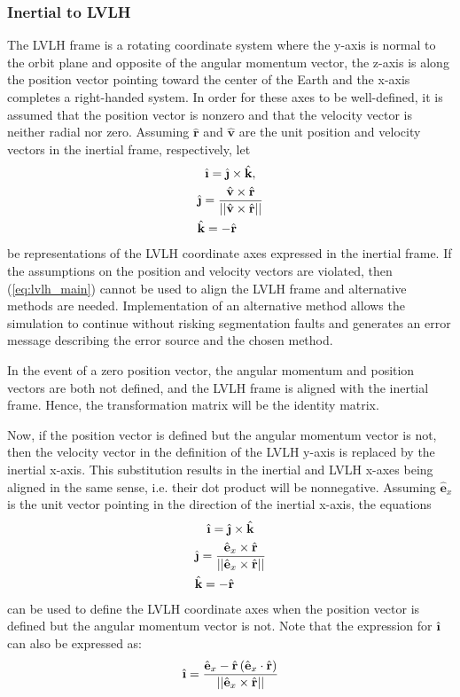 \documentclass[11pt,fleqn]{report}
\begin{document}
\subsubsection{Inertial to LVLH}
The LVLH frame is a rotating coordinate system where the y-axis is normal to
the
orbit plane and opposite of the angular momentum vector, the z-axis
is along the position vector pointing toward the center of the Earth and
the x-axis
completes a right-handed system. In order for these axes to be well-defined,
it
is assumed that the position vector is nonzero and that the velocity vector is
neither radial nor zero. Assuming $\hat{\textbf{r}}$ and $\hat{\textbf{v}}$
are the unit position and velocity vectors in the inertial frame,
respectively, let
\begin{multline}
 \hat{\textbf{\i}} = \hat{\textbf{\j}} \times \hat{\textbf{k}}, \\
 \hat{\textbf{\j}} = \frac{\hat{\textbf{v}} \times \hat{\textbf{r}}}
{||\hat{\textbf{v}} \times \hat{\textbf{r}} ||} \\
 \hat{\textbf{k}} = -\hat{\textbf{r}} \hfill
 \label{eq:lvlh_main}
 \end{multline}
be representations of the LVLH coordinate axes expressed in the inertial
frame.
If the assumptions on the position and velocity vectors are violated, then
(\ref{eq:lvlh_main})
cannot be used to align the LVLH frame and alternative methods are needed.
Implementation of an alternative method allows the simulation to continue
without risking segmentation faults and generates an error message describing
the error source and the chosen method.

In the event of a zero position vector, the angular momentum and position
vectors are both not defined, and the LVLH frame is aligned with the inertial
frame. Hence, the transformation matrix will be the identity matrix.

Now, if the position vector is defined but the angular momentum vector is not,
then the velocity vector in the definition of the LVLH y-axis is replaced by
the
inertial x-axis. This substitution results in the inertial and LVLH x-axes
being
aligned in the same sense, i.e. their dot product will be nonnegative.
Assuming
$\hat{\textbf{e}}_x$ is the unit vector pointing in the direction of the
inertial x-axis, the equations
\begin{multline}
 \hat{\textbf{\i}} = \hat{\textbf{\j}} \times \hat{\textbf{k}} \\
 \hat{\textbf{\j}} = \frac{\hat{\textbf{e}}_x \times \hat{\textbf{r}}}
{||\hat{\textbf{e}}_x \times \hat{\textbf{r}} ||} \\
 \hat{\textbf{k}} = -\hat{\textbf{r}} \hfill
 \label{eq:lvlh_nox}
\end{multline}
can be used to define the LVLH coordinate axes when the position vector is
defined but the angular momentum vector is not. Note that the expression
for $\hat{\textbf{\i}}$ can also be expressed as:
\begin{equation}
 \hfill \hat{\textbf{\i}} =
\frac{\hat{\textbf{e}}_x -
\hat{\textbf{r}}
\left( \hat{\textbf{e}}_x \cdot \hat{\textbf{r}} \right)}
 {||\hat{\textbf{e}}_x \times \hat{\textbf{r}}||} \hfill
\end{equation}
\end{document}
